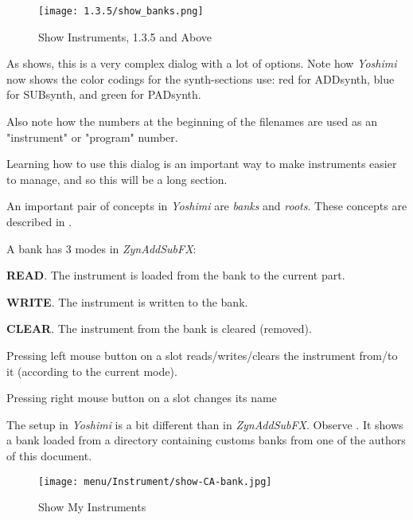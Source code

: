 
\begin{figure}[H]
   \centering 
   \texttt{[image: 1.3.5/show\_banks.png]}
   \caption[Show Instruments]{Show Instruments, 1.3.5 and Above}
   \label{fig:show_instruments}
\end{figure}

   As 
   shows, this is a very complex dialog with a lot of options.
   Note how \textsl{Yoshimi} now shows the color codings for the
   synth-sections use:  red for ADDsynth, blue for SUBsynth, and
   green for PADsynth.

   Also note how the numbers at the beginning of the filenames are used as
   an "instrument" or "program" number.

   Learning how to use this dialog is an important way to make
   instruments easier to manage, and so this will be a long section.

   An important pair of concepts in \textsl{Yoshimi} are
   \textsl{banks} and \textsl{roots}.  These concepts are described in
   .

   A bank has 3 modes in \textsl{ZynAddSubFX}: 

      \begin{enumber}
         \item \textbf{READ}.
            The instrument is loaded from the bank to the current part.
         \item \textbf{WRITE}.
            The instrument is written to the bank.
         \item \textbf{CLEAR}.
            The instrument from the bank is cleared (removed).
      \end{enumber}

   Pressing left mouse button on a slot reads/writes/clears the instrument
   from/to it (according to the current mode).
   
   Pressing right mouse button on a slot changes its name

   The setup in \textsl{Yoshimi} is a bit different than in
   \textsl{ZynAddSubFX}.
   Observe .
   It shows a bank loaded from a directory containing customs
   banks from one of the authors of this document.


\begin{figure}[H]
   \centering 
   \texttt{[image: menu/Instrument/show-CA-bank.jpg]}
   \caption[Show CA's Instruments]{Show My Instruments}
   \label{fig:show_ca_bank}
\end{figure}

